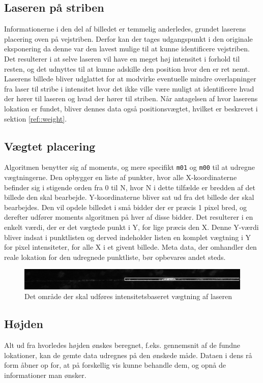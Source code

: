 \subsection{Laseren på striben}
Informationerne i den del af billedet er temmelig anderledes, grundet laserens placering oven på vejstriben. Derfor kan der tages udgangspunkt i den originale eksponering da denne var den lavest mulige til at kunne identificere vejstriben. Det resulterer i at selve laseren vil have en meget høj intensitet i forhold til resten, og det udnyttes til at kunne adskille den position hvor den er ret nemt. Laserens billede bliver udglattet for at modvirke eventuelle mindre overlapninger fra laser til stribe i intensitet hvor det ikke ville være muligt at identificere hvad der hører til laseren og hvad der hører til striben. Når antagelsen af hvor laserens lokation er fundet, bliver dennes data også positionsvægtet, hvilket er beskrevet i sektion \ref{ref::weight}.

\subsection{Vægtet placering\label{ref::weight}}
Algoritmen benytter sig af moments, og mere specifikt \texttt{m01} og \texttt{m00} til at udregne vægtningerne.
Den opbygger en liste af punkter, hvor alle X-koordinaterne befinder sig i stigende orden fra 0 til N, hvor N i dette tilfælde er bredden af det billede den skal bearbejde.
Y-koordinaterne bliver sat ud fra det billede der skal bearbejdes. Den vil opdele billedet i små bidder der er præcis 1 pixel bred, og derefter udfører moments algoritmen på hver af disse bidder. Det resulterer i en enkelt værdi, der er det vægtede punkt i Y, for lige præcis den X. Denne Y-værdi bliver indsat i punktlisten og derved indeholder listen en komplet vægtning i Y for pixel intensiteter, for alle X i et givent billede. Meta data, der omhandler den reale lokation for den udregnede punktliste, bør opbevares andet steds.

\begin{figure}[h]
	\centering
	\includegraphics[width=0.7\linewidth]{Billeder/base_5_boxing}
	\caption{Det område der skal udføres intensitetsbaseret vægtning af laseren}
	\label{fig:base_5_boxing}
\end{figure}

\subsection{Højden}
Alt ud fra hvorledes højden ønskes beregnet, f.eks. gennemsnit af de fundne lokationer, kan de gemte data udregnes på den ønskede måde. Dataen i dens rå form åbner op for, at på forskellig vis kunne behandle dem, og opnå de informationer man ønsker.

